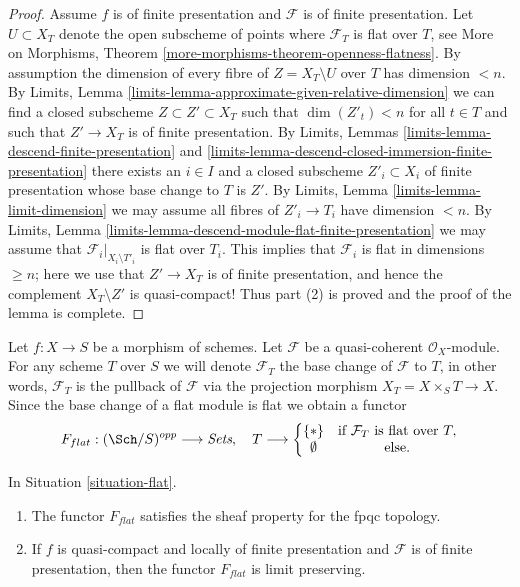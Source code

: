 \begin{proof}
\medskip\noindent
Assume $f$ is of finite presentation and $\mathcal{F}$ is of finite
presentation. Let $U \subset X_T$ denote the open subscheme of points where
$\mathcal{F}_T$ is flat over $T$, see
More on Morphisms, Theorem \ref{more-morphisms-theorem-openness-flatness}.
By assumption the dimension of every fibre of $Z = X_T \setminus U$ over
$T$ has dimension $< n$. By
Limits, Lemma \ref{limits-lemma-approximate-given-relative-dimension}
we can find a closed subscheme $Z \subset Z' \subset X_T$
such that $\dim(Z'_t) < n$ for all $t \in T$ and such that
$Z' \to X_T$ is of finite presentation. By
Limits, Lemmas \ref{limits-lemma-descend-finite-presentation} and
\ref{limits-lemma-descend-closed-immersion-finite-presentation}
there exists an $i \in I$ and a closed subscheme $Z'_i \subset X_i$
of finite presentation whose base change to $T$ is $Z'$. By
Limits, Lemma \ref{limits-lemma-limit-dimension}
we may assume all fibres of $Z'_i \to T_i$ have dimension $< n$. By
Limits, Lemma \ref{limits-lemma-descend-module-flat-finite-presentation}
we may assume that $\mathcal{F}_i|_{X_i \setminus T'_i}$
is flat over $T_i$. This implies that $\mathcal{F}_i$ is
flat in dimensions $\geq n$; here we use that $Z' \to X_T$ is of finite
presentation, and hence the complement $X_T \setminus Z'$ is quasi-compact!
Thus part (2) is proved and the proof of the lemma is complete.
\end{proof}

\begin{situation}
\label{situation-flat}
Let $f : X \to S$ be a morphism of schemes.
Let $\mathcal{F}$ be a quasi-coherent $\mathcal{O}_X$-module.
For any scheme $T$ over $S$ we will denote $\mathcal{F}_T$ the
base change of $\mathcal{F}$ to $T$, in other words, $\mathcal{F}_T$
is the pullback of $\mathcal{F}$ via the projection morphism
$X_T = X \times_S T \to X$. Since the base change of a flat module
is flat we obtain a functor
\begin{equation}
\label{equation-flat}
F_{flat} : (\Sch/S)^{opp} \longrightarrow \textit{Sets}, \quad
T \longrightarrow \left\{
\begin{matrix}
\{*\} & \text{if } \mathcal{F}_T \text{ is flat over }T, \\
\emptyset & \text{else.}
\end{matrix}
\right.
\end{equation}
\end{situation}

\begin{lemma}
\label{lemma-flat}
In Situation \ref{situation-flat}.
\begin{enumerate}
\item The functor $F_{flat}$ satisfies the sheaf property for the fpqc topology.
\item If $f$ is quasi-compact and locally of finite presentation
and $\mathcal{F}$ is of finite presentation, then the functor
$F_{flat}$ is limit preserving.
\end{enumerate}
\end{lemma}

